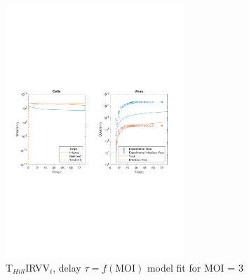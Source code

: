 \begin{figure}[H]
\begin{center}
\includegraphics[width=0.6\textwidth, trim={1cm 9.5cm 1cm 9.5cm}, clip]{D_chapters/6_appendix/4_THillIRVViDelay/ModelTHillIRVViDelayDSNSaenz2010FittedMOI3B0.0010133D0.55548P3247.2256C0.0027335TIC1896440.1965TH4.9813iFrac0.11736log.pdf}
\caption[T$_{Hill}$IRVV$_i$, delay $\tau = f(\text{MOI})$ model fit for MOI = 3]%
{T$_{Hill}$IRVV$_i$, delay $\tau = f(\text{MOI})$ model fit for MOI = 3}
\label{figure:THillIRVViDelayMOI3}
\end{center}
\end{figure}

